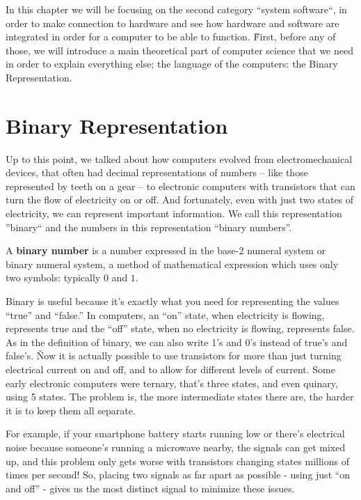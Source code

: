 In this chapter we will be focusing on the second category ``system software``, in order to make connection to
hardware and see how hardware and software are integrated in order for a computer to be able to function. \v

First, before any of those, we will introduce a main theoretical part of computer science that we need in order to
explain everything else; the language of the computers: the Binary Representation.

\section{Binary Representation}

Up to this point, we talked about how computers evolved from electromechanical devices, that often had decimal
representations of numbers – like those represented by teeth on a gear – to electronic computers with transistors
that can turn the flow of electricity on or off. And fortunately, even with just two states of electricity, we can
represent important information. We call this representation ''binary`` and the numbers in this representation
``binary numbers''.

A \textbf{binary number} is a number expressed in the base-2 numeral system or binary numeral system, a method of
mathematical expression which uses only two symbols: typically $0$ and $1$.
\ed

Binary is useful because it's exactly what you need for representing the values ``true'' and ``false.'' In computers,
an ``on'' state, when electricity is flowing, represents true and the ``off'' state, when no electricity is flowing,
represents false. As in the definition of binary, we can also write 1's and 0's instead of true's and false's. \v

Now it is actually possible to use transistors for more than just turning electrical current on and off, and to allow
for different levels of current. Some early electronic computers were ternary, that's three states, and even quinary,
using 5 states. The problem is, the more intermediate states there are, the harder it is to keep them all separate.

\be
For example, if your smartphone battery starts running low or there's electrical noise because someone's running a
microwave nearby, the signals can get mixed up, and this problem only gets worse with transistors changing states
millions of times per second! So, placing two signals as far apart as possible - using just ``on and off'' - gives us
the most distinct signal to minimize these issues.
\ee

